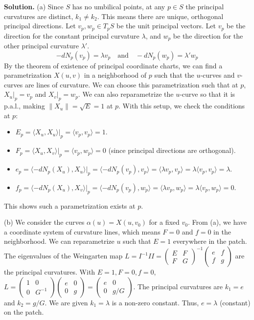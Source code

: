 \documentclass[12pt, a4paper, oneside]{article}
\newenvironment{solution}
  {\par\noindent\textbf{Solution. }\newline}
  {\par}
\begin{document}
\begin{solution}
(a) Since $S$ has no umbilical points, at any $p \in S$ the principal curvatures are distinct, $k_1 \ne k_2$. This means there are unique, orthogonal principal directions.
Let $v_p, w_p \in T_pS$ be the unit principal vectors.
Let $v_p$ be the direction for the constant principal curvature $\lambda$, and $w_p$ be the direction for the other principal curvature $\lambda'$.
\[ -dN_p(v_p) = \lambda v_p \text{} \quad \text{and} \quad -dN_p(w_p) = \lambda' w_p \text{} \]
By the theorem of existence of principal coordinate charts, we can find a parametrization $X(u,v)$ in a neighborhood of $p$ such that the $u$-curves and $v$-curves are lines of curvature.
We can choose this parametrization such that at $p$, $X_u|_p = v_p$ and $X_v|_p = w_p$. We can also reparametrize the $u$-curve so that it is p.a.l., making $\|X_u\| = \sqrt{E} = 1$ at $p$.
With this setup, we check the conditions at $p$:
\begin{itemize}
    \item $E_p = \langle X_u, X_u \rangle|_p = \langle v_p, v_p \rangle = 1$.
    \item $F_p = \langle X_u, X_v \rangle|_p = \langle v_p, w_p \rangle = 0$ (since principal directions are orthogonal).
    \item $e_p = \langle -dN_p(X_u), X_u \rangle|_p = \langle -dN_p(v_p), v_p \rangle = \langle \lambda v_p, v_p \rangle = \lambda \langle v_p, v_p \rangle = \lambda$.
    \item $f_p = \langle -dN_p(X_u), X_v \rangle|_p = \langle -dN_p(v_p), w_p \rangle = \langle \lambda v_p, w_p \rangle = \lambda \langle v_p, w_p \rangle = 0$.
\end{itemize}
This shows such a parametrization exists at $p$.

(b) We consider the curves $\alpha(u) = X(u, v_0)$ for a fixed $v_0$.
From (a), we have a coordinate system of curvature lines, which means $F=0$ and $f=0$ in the neighborhood. We can reparametrize $u$ such that $E=1$ everywhere in the patch.
The eigenvalues of the Weingarten map $L = I^{-1} II = \begin{pmatrix} E & F \\ F & G \end{pmatrix}^{-1} \begin{pmatrix} e & f \\ f & g \end{pmatrix}$ are the principal curvatures.
With $E=1, F=0, f=0$, $L = \begin{pmatrix} 1 & 0 \\ 0 & G^{-1} \end{pmatrix} \begin{pmatrix} e & 0 \\ 0 & g \end{pmatrix} = \begin{pmatrix} e & 0 \\ 0 & g/G \end{pmatrix}$.
The principal curvatures are $k_1 = e$ and $k_2 = g/G$.
We are given $k_1 = \lambda$ is a non-zero constant. Thus, $e = \lambda$ (constant) on the patch.


\end{solution}
\end{document}

